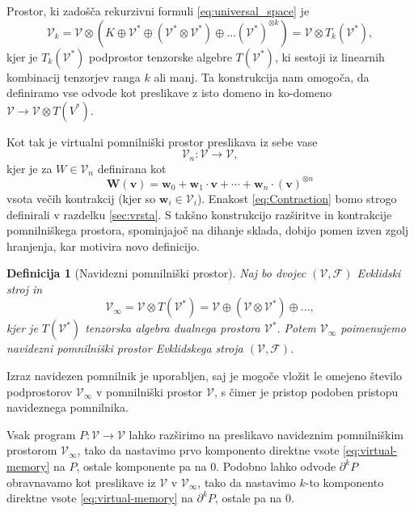 \documentclass[a4paper, 12pt]{book}
\newcommand{\bfW}{\mathbf{W}}
\newcommand{\bfw}{\mathbf{w}}
\newcommand{\VV}{\mathcal{V}}
\newcommand{\vv}{\mathbf{v}}
\newcommand{\F}{\mathcal{F}}
\newcommand{\D}{\partial}
\newtheorem{definicija}{Definicija}[chapter]
\begin{document}
Prostor, ki zadošča rekurzivni formuli \eqref{eq:universal_space} je
\begin{equation}
    \label{eq:k-th-virtual-space}
    \VV_k = \VV\otimes \left(K\oplus \VV^* \oplus (\VV^*\otimes \VV^*)\oplus\ldots
      (\VV^*)^{\otimes k}\right) = \VV\otimes T_k(\VV^*),
  \end{equation}
kjer je $T_k(\VV^*)$ podprostor tenzorske algebre $T(\VV^*)$, ki sestoji iz linearnih kombinacij tenzorjev ranga $k$ ali manj. Ta konstrukcija nam omogoča, da definiramo vse odvode kot preslikave z isto domeno in ko-domeno $\VV\to\VV\otimes T(V^*)$.

Kot tak je virtualni pomnilniški prostor preslikava iz sebe vase
\begin{equation}
\VV_n:\VV\to\VV,
\end{equation}
kjer je za $W\in\VV_n$ definirana kot 
\begin{equation}
\bfW(\vv)=\bfw_0+\bfw_1\cdot\vv+\cdots+\bfw_n\cdot(\vv)^{\otimes n}\label{eq:Contraction}
\end{equation}
vsota večih kontrakcij (kjer so $\bfw_i\in\VV_i$). Enakost \eqref{eq:Contraction} bomo strogo definirali v razdelku \ref{sec:vrsta}. S takšno konstrukcijo razširitve in kontrakcije pomnilniškega prostora, spominjajoč na dihanje sklada, dobijo pomen izven zgolj hranjenja, kar motivira novo definicijo.
\begin{definicija}[Navidezni pomnilniški prostor]
Naj bo dvojec $(\VV,\F)$ Evklidski stroj in
\begin{equation}
\VV_\infty = \VV\otimes T(\VV^*) = \VV\oplus
(\VV\otimes\VV^*)\oplus\ldots,\label{eq:virtual-memory}
\end{equation}
kjer je $T(\VV^*)$ tenzorska algebra dualnega prostora $\VV^*$. Potem $\VV_\infty$ poimenujemo navidezni pomnilniški prostor Evklidskega stroja $(\VV,\F)$.
\end{definicija}
Izraz navidezen pomnilnik je uporabljen, saj je mogoče vložit le omejeno število podprostorov $\VV_\infty$ v pomnilniški prostor $\VV$, s čimer je pristop podoben pristopu navideznega pomnilnika.

Vsak program $P:\VV\to\VV$ lahko razširimo na preslikavo navideznim pomnilniškim prostorom $\VV_\infty$, tako da nastavimo prvo komponento direktne vsote \eqref{eq:virtual-memory} na $P$, ostale komponente pa na $0$. Podobno lahko odvode $\D^k P$ obravnavamo kot preslikave iz $\VV$ v $\VV_\infty$, tako da nastavimo $k$-to komponento direktne vsote \eqref{eq:virtual-memory} na $\D^k P$, ostale pa na $0$.
\end{document}
